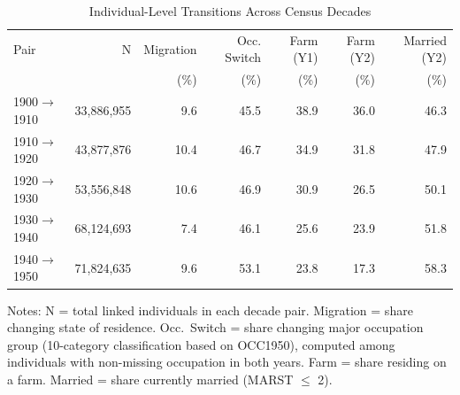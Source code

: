 
\begin{table}[H]
\centering
\caption{Individual-Level Transitions Across Census Decades}
\begin{threeparttable}
\small
\begin{tabular}{lrrrrrr}
\toprule
Pair & N & Migration & Occ. Switch & Farm (Y1) & Farm (Y2) & Married (Y2) \\
& & (\%) & (\%) & (\%) & (\%) & (\%) \\
\midrule
1900$\rightarrow$1910 & 33,886,955 & 9.6 & 45.5 & 38.9 & 36.0 & 46.3 \\
1910$\rightarrow$1920 & 43,877,876 & 10.4 & 46.7 & 34.9 & 31.8 & 47.9 \\
1920$\rightarrow$1930 & 53,556,848 & 10.6 & 46.9 & 30.9 & 26.5 & 50.1 \\
1930$\rightarrow$1940 & 68,124,693 & 7.4 & 46.1 & 25.6 & 23.9 & 51.8 \\
1940$\rightarrow$1950 & 71,824,635 & 9.6 & 53.1 & 23.8 & 17.3 & 58.3 \\
\bottomrule
\end{tabular}
\begin{tablenotes}[flushleft]
\small
\item Notes: N = total linked individuals in each decade pair. Migration = share changing state of residence. Occ.\ Switch = share changing major occupation group (10-category classification based on OCC1950), computed among individuals with non-missing occupation in both years. Farm = share residing on a farm. Married = share currently married (MARST $\leq$ 2).
\end{tablenotes}
\end{threeparttable}
\label{tab:transitions}
\end{table}

